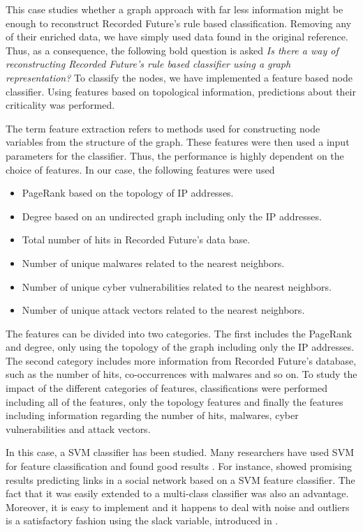 This case studies whether a graph approach with far less information might be enough to reconstruct Recorded Future's rule based classification. Removing any of their enriched data, we have simply used data found in the original reference. Thus, as a consequence, the following bold question is asked \textit{Is there a way of reconstructing Recorded Future's rule based classifier using a graph representation?} 
To classify the nodes, we have implemented a feature based node classifier. Using features based on topological information, predictions about their criticality was performed.

The term feature extraction refers to methods used for constructing node variables from the structure of the graph. These features were then used a input parameters for the classifier. Thus, the performance is highly dependent on the choice of features. In our case, the following features were used
\begin{itemize}
    \item PageRank based on the topology of IP addresses.
    \item Degree based on an undirected graph including only the IP addresses.
    \item Total number of hits in Recorded Future's data base.
    \item Number of unique malwares related to the nearest neighbors.
    \item Number of unique cyber vulnerabilities related to the nearest neighbors.
    \item Number of unique attack vectors related to the nearest neighbors.
\end{itemize}

The features can be divided into two categories. The first includes the PageRank and degree, only using the topology of the graph including only the IP addresses. The second category includes more information from Recorded Future's database, such as the number of hits, co-occurrences with malwares and so on. To study the impact of the different categories of features, classifications were performed including all of the features, only the topology features and finally the features including information regarding the number of hits, malwares, cyber vulnerabilities and attack vectors.

In this case, a SVM classifier has been studied. Many researchers have used SVM for feature classification and found good results \citep{campbell2011}. For instance, \citet{liu2012} showed promising results predicting links in a social network based on a SVM feature classifier. The fact that it was easily extended to a multi-class classifier was also an advantage. Moreover, it is easy to implement and it happens to deal with noise and outliers is a satisfactory fashion using the slack variable, introduced in .

